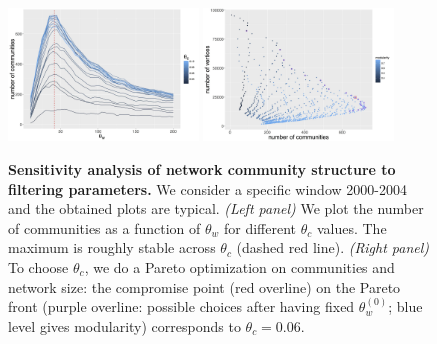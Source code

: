 \documentclass[12pt,twoside,a4paper]{article}
\begin{document}
\begin{figure}
\centering
\includegraphics[width=0.45\textwidth,height=0.25\textheight]{comnum_thetaw_2004.jpg}
\includegraphics[width=0.45\textwidth,height=0.25\textheight]{comnum_vcount_pareto_2004.jpg}
\caption{\textbf{Sensitivity analysis of network community structure to filtering parameters.} We consider a specific window 2000-2004 and the obtained plots are typical. \textit{(Left panel)} We plot the number of communities as a function of $\theta_w$ for different $\theta_c$ values. The maximum is roughly stable across $\theta_c$ (dashed red line). \textit{(Right panel)} To choose $\theta_c$, we do a Pareto optimization on communities and network size: the compromise point (red overline) on the Pareto front (purple overline: possible choices after having fixed $\theta_w^{(0)}$; blue level gives modularity) corresponds to $\theta_c = 0.06$.}
\label{fig:networksensitivity}
\end{figure}
\end{document}
